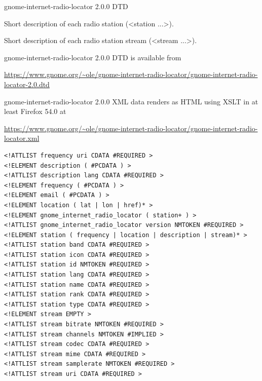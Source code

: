 \documentclass[20pt,landscape]{foils}
\begin{document}
\begin{list1}
\item gnome-internet-radio-locator 2.0.0 DTD
\item Short description of each radio station (<station ...>).
\item Short description of each radio station stream (<stream ...>).
\item gnome-internet-radio-locator 2.0.0 DTD is available from \begin{tiny}\url{https://www.gnome.org/~ole/gnome-internet-radio-locator/gnome-internet-radio-locator-2.0.dtd}\end{tiny}
\item gnome-internet-radio-locator 2.0.0 XML data renders as HTML using XSLT in at least Firefox 54.0 at \begin{tiny}\url{https://www.gnome.org/~ole/gnome-internet-radio-locator/gnome-internet-radio-locator.xml}\end{tiny}
\end{list1}



\begin{tiny}
\begin{verbatim}
<!ATTLIST frequency uri CDATA #REQUIRED >
<!ELEMENT description ( #PCDATA ) >
<!ATTLIST description lang CDATA #REQUIRED >
<!ELEMENT frequency ( #PCDATA ) >
<!ELEMENT email ( #PCDATA ) >
<!ELEMENT location ( lat | lon | href)* >
<!ELEMENT gnome_internet_radio_locator ( station+ ) >
<!ATTLIST gnome_internet_radio_locator version NMTOKEN #REQUIRED >
<!ELEMENT station ( frequency | location | description | stream)* >
<!ATTLIST station band CDATA #REQUIRED >
<!ATTLIST station icon CDATA #REQUIRED >
<!ATTLIST station id NMTOKEN #REQUIRED >
<!ATTLIST station lang CDATA #REQUIRED >
<!ATTLIST station name CDATA #REQUIRED >
<!ATTLIST station rank CDATA #REQUIRED >
<!ATTLIST station type CDATA #REQUIRED >
<!ELEMENT stream EMPTY >
<!ATTLIST stream bitrate NMTOKEN #REQUIRED >
<!ATTLIST stream channels NMTOKEN #IMPLIED >
<!ATTLIST stream codec CDATA #REQUIRED >
<!ATTLIST stream mime CDATA #REQUIRED >
<!ATTLIST stream samplerate NMTOKEN #REQUIRED >
<!ATTLIST stream uri CDATA #REQUIRED >
\end{verbatim}
\end{tiny}

\end{document}
